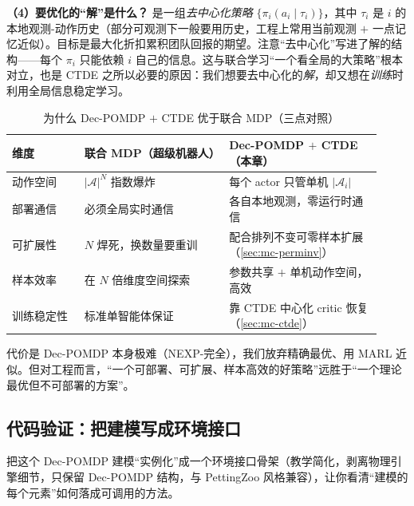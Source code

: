 \textbf{（4）要优化的“解”是什么？} 是一组\emph{去中心化策略} $\{\pi_i(a_i\mid\tau_i)\}$，其中 $\tau_i$ 是 $i$ 的本地观测-动作历史（部分可观测下一般要用历史，工程上常用当前观测 $+$ 一点记忆近似）。目标是最大化折扣累积团队回报的期望。注意“去中心化”写进了解的结构——每个 $\pi_i$ 只能依赖 $i$ 自己的信息。这与联合学习“一个看全局的大策略”根本对立，也是 CTDE 之所以必要的原因：我们想要去中心化的\emph{解}，却又想在\emph{训练}时利用全局信息稳定学习。

\begin{table}[H]\centering\small
\caption{为什么 Dec-POMDP $+$ CTDE 优于联合 MDP（三点对照）}
\label{tab:mc-vs-joint}
\begin{tabular}{p{0.18\linewidth}p{0.36\linewidth}p{0.38\linewidth}}
\toprule
维度 & 联合 MDP（超级机器人） & Dec-POMDP $+$ CTDE（本章） \\
\midrule
动作空间 & $|\mathcal{A}|^N$ 指数爆炸 & 每个 actor 只管单机 $|\mathcal{A}_i|$ \\
部署通信 & 必须全局实时通信 & 各自本地观测，零运行时通信 \\
可扩展性 & $N$ 焊死，换数量要重训 & 配合排列不变可零样本扩展（\cref{sec:mc-perminv}） \\
样本效率 & 在 $N$ 倍维度空间探索 & 参数共享 $+$ 单机动作空间，高效 \\
训练稳定性 & 标准单智能体保证 & 靠 CTDE 中心化 critic 恢复（\cref{sec:mc-ctde}） \\
\bottomrule
\end{tabular}
\end{table}

\noindent 代价是 Dec-POMDP 本身极难（NEXP-完全），我们放弃精确最优、用 MARL 近似。但对工程而言，“一个可部署、可扩展、样本高效的好策略”远胜于“一个理论最优但不可部署的方案”。

\subsection{代码验证：把建模写成环境接口}
\label{sec:mc-decpomdp-code}

把这个 Dec-POMDP 建模“实例化”成一个环境接口骨架（教学简化，剥离物理引擎细节，只保留 Dec-POMDP 结构，与 PettingZoo 风格兼容），让你看清“建模的每个元素”如何落成可调用的方法。

